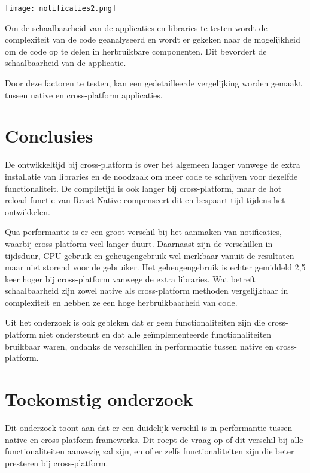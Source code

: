 \documentclass[a0,portrait]{hogent-poster}
\begin{document}
\begin{multicols}{2}
\begin{center}
  \captionsetup{type=figure}
  \texttt{[image: notificaties2.png]}
\end{center}

Om de schaalbaarheid van de applicaties en libraries te testen wordt de complexiteit van
de code geanalyseerd en wordt er gekeken naar de mogelijkheid om de code op te delen in
herbruikbare componenten. Dit bevordert de schaalbaarheid van de applicatie.

Door deze factoren te testen, kan een gedetailleerde vergelijking worden gemaakt tussen 
native en cross-platform applicaties.

\section{Conclusies}
De ontwikkeltijd bij cross-platform is over het algemeen langer vanwege de extra 
installatie van libraries en de noodzaak om meer code te schrijven voor dezelfde 
functionaliteit. De compiletijd is ook langer bij cross-platform, maar de hot 
reload-functie van React Native compenseert dit en bespaart tijd tijdens het ontwikkelen. 

Qua performantie is er een groot verschil bij het aanmaken van notificaties, waarbij 
cross-platform veel langer duurt. Daarnaast zijn de verschillen in tijdsduur, 
CPU-gebruik en geheugengebruik wel merkbaar vanuit de resultaten maar niet storend 
voor de gebruiker. Het geheugengebruik is echter gemiddeld 2,5 keer hoger bij 
cross-platform vanwege de extra libraries. Wat betreft schaalbaarheid zijn zowel 
native als cross-platform methoden vergelijkbaar in complexiteit en hebben ze een 
hoge herbruikbaarheid van code. 

Uit het onderzoek is ook gebleken dat er geen functionaliteiten zijn die cross-platform 
niet ondersteunt en dat alle geïmplementeerde functionaliteiten bruikbaar waren, ondanks de 
verschillen in performantie tussen native en cross-platform.

\section{Toekomstig onderzoek}
Dit onderzoek toont aan dat er een duidelijk verschil is in performantie tussen native en 
cross-platform frameworks. Dit roept de vraag op of dit verschil bij alle functionaliteiten 
aanwezig zal zijn, en of er zelfs functionaliteiten zijn die beter presteren bij cross-platform. 


\end{multicols}
\end{document}

